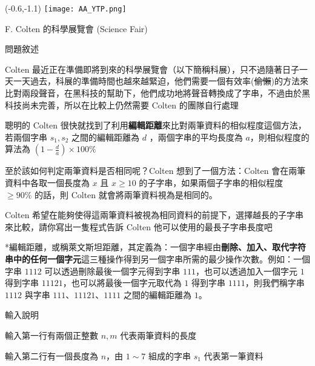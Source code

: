 \documentclass[12pt]{article}
\newcommand{\ProblemTitleFont}{\ProblemTitleMainFont\ProblemTitleCJKFont}
\newcommand{\ProblemTitle}[2]{\noindent\Large{\ProblemTitleFont #1 (#2)}\normalsize\par}
\newcommand{\ProblemSection}[1]{\vspace{0.6cm}\par\noindent\large{\ProblemTitleFont #1}\normalsize\par}
\newcommand{\ProblemStatement}{\ProblemSection{問題敘述}}
\newcommand{\ProblemInput}{\ProblemSection{輸入說明}}
\begin{document}

\begin{textblock}{0.1}(-0.6,-1.1)
	\texttt{[image: AA\_YTP.png]}
\end{textblock}




\renewcommand{\headrulewidth}{0pt}
\renewcommand{\baselinestretch}{1.3}
\setlength\parindent{24pt}
\setlength\parskip{12pt}
\cfoot{\thepage}

\ProblemTitle{F. Colten 的科學展覽會}{Science Fair}

\ProblemStatement

Colten 最近正在準備即將到來的科學展覽會（以下簡稱科展），只不過隨著日子一天一天過去，科展的準備時間也越來越緊迫，他們需要一個有效率(\sout{偷懶})的方法來比對兩段聲音，在黑科技的幫助下，他們成功地將聲音轉換成了字串，不過由於黑科技尚未完善，所以在比較上仍然需要 Colten 的團隊自行處理


聰明的 Colten 很快就找到了利用\textbf{編輯距離}來比對兩筆資料的相似程度這個方法，若兩個字串 $s_1,s_2$ 之間的編輯距離為 $d$ ，兩個字串的平均長度為 $a$，則相似程度的算法為 $(1-\frac{d}{a}) \times 100\%$

至於該如何判定兩筆資料是否相同呢？Colten 想到了一個方法：Colten 會在兩筆資料中各取一個長度為 $x$ 且 $x \ge 10$ 的子字串，如果兩個子字串的相似程度 $\ge 90\%$ 的話，則 Colten 就會將兩筆資料視為是相同的。 

Colten 希望在能夠使得這兩筆資料被視為相同資料的前提下，選擇越長的子字串來比較，請你寫出一隻程式告訴 Colten 他可以使用的最長子字串長度吧

*編輯距離，或稱萊文斯坦距離，其定義為：一個字串經由\textbf{刪除、加入、取代字符串中的任何一個字元}這三種操作得到另一個字串所需的最少操作次數。例如：一個字串 $1112$ 可以透過刪除最後一個字元得到字串 $111$，也可以透過加入一個字元 $1$ 得到字串 $11121$，也可以將最後一個字元取代為 $1$ 得到字串 $1111$，則我們稱字串 $1112$ 與字串 $111$、$11121$、$1111$ 之間的編輯距離為 $1$。

\ProblemInput

輸入第一行有兩個正整數 $n,m$ 代表兩筆資料的長度

輸入第二行有一個長度為 $n$，由 $1\sim7$ 組成的字串 $s_1$ 代表第一筆資料
\end{document}
